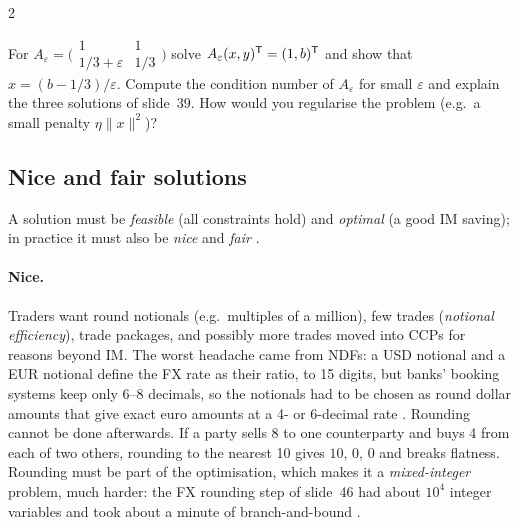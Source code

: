 \begin{paracol}{2}
\begin{exercise}
For $A_\varepsilon=\bigl(\begin{smallmatrix}1&1\\ 1/3+\varepsilon&1/3\end{smallmatrix}\bigr)$ solve $A_\varepsilon(x,y)^{\mathsf T}=(1,b)^{\mathsf T}$
and show that $x=(b-1/3)/\varepsilon$. Compute the condition number of $A_\varepsilon$ for small $\varepsilon$ and explain the
three solutions of slide~39. How would you regularise the problem (e.g.\ a small penalty $\eta\|x\|^2$)?
\end{exercise}

\subsection{Nice and fair solutions}
A solution must be \emph{feasible} (all constraints hold) and \emph{optimal} (a good IM saving); in practice it
must also be \emph{nice} and \emph{fair} .

\paragraph{Nice.} Traders want round notionals (e.g.\ multiples of a million), few trades (\emph{notional
efficiency}), trade packages, and possibly more trades moved into CCPs for reasons beyond IM. The worst headache
came from NDFs: a USD notional and a EUR notional define the FX rate as their ratio, to 15 digits, but banks' booking
systems keep only 6--8 decimals, so the notionals had to be chosen as round dollar amounts that give exact euro
amounts at a 4- or 6-decimal rate . Rounding cannot be done afterwards. If a party sells 8 to one
counterparty and buys 4 from each of two others, rounding to the nearest 10 gives $10$, $0$, $0$ and breaks
flatness. Rounding must be part of the optimisation, which makes it a \emph{mixed-integer} problem, much harder:
the FX rounding step of slide~46 had about $10^4$ integer variables and took about a minute of branch-and-bound
.


\end{paracol}
